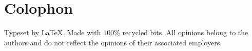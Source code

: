 \documentclass[12pt]{article}
\begin{document}

{}
\printbibliography
\section*{Colophon}

Typeset by \LaTeX . Made with \( 100\%  \) recycled bits.
All opinions belong to the authors and do not reflect the opinions
of their associated employers.
\end{document}
